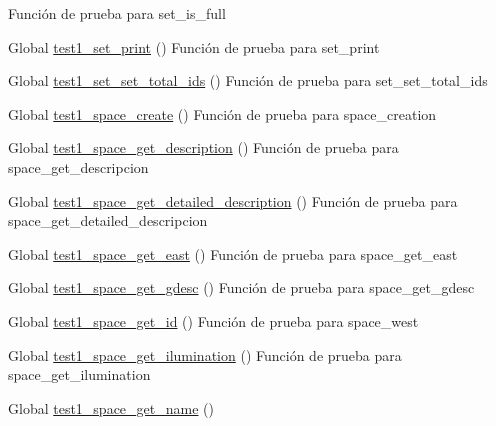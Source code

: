 \begin{DoxyRefList}
Función de prueba para set\+\_\+is\+\_\+full  
\item[Global \mbox{\hyperlink{set__test_8c_a3c854f4944f73793ff85c2490401b6e8}{test1\+\_\+set\+\_\+print}} ()]\label{test__test000239}%
%
Función de prueba para set\+\_\+print  
\item[Global \mbox{\hyperlink{set__test_8c_a4421e7919bd16efc335f14d678fb9560}{test1\+\_\+set\+\_\+set\+\_\+total\+\_\+ids}} ()]\label{test__test000219}%
%
Función de prueba para set\+\_\+set\+\_\+total\+\_\+ids  
\item[Global \mbox{\hyperlink{space__test_8c_a69278cc022dc5688d4725f8d36317b30}{test1\+\_\+space\+\_\+create}} ()]\label{test__test000244}%
%
Función de prueba para space\+\_\+creation  
\item[Global \mbox{\hyperlink{space__test_8c_a9a9da97ed6f49f2ae325177caecfea9c}{test1\+\_\+space\+\_\+get\+\_\+description}} ()]\label{test__test000285}%
%
Función de prueba para space\+\_\+get\+\_\+descripcion  
\item[Global \mbox{\hyperlink{space__test_8c_ab00e408d268230a4ebfa789ce2fba104}{test1\+\_\+space\+\_\+get\+\_\+detailed\+\_\+description}} ()]\label{test__test000295}%
%
Función de prueba para space\+\_\+get\+\_\+detailed\+\_\+descripcion  
\item[Global \mbox{\hyperlink{space__test_8c_a354adb2722b06ec65b7212d2736d6417}{test1\+\_\+space\+\_\+get\+\_\+east}} ()]\label{test__test000267}%
%
Función de prueba para space\+\_\+get\+\_\+east  
\item[Global \mbox{\hyperlink{space__test_8c_a3b6d16613ee2f3940fe7c92f3934508a}{test1\+\_\+space\+\_\+get\+\_\+gdesc}} ()]\label{test__test000280}%
%
Función de prueba para space\+\_\+get\+\_\+gdesc  
\item[Global \mbox{\hyperlink{space__test_8c_a920df9e02482f4f1e6a5ebcaec523860}{test1\+\_\+space\+\_\+get\+\_\+id}} ()]\label{test__test000257}%
%
Función de prueba para space\+\_\+west  
\item[Global \mbox{\hyperlink{space__test_8c_abbf8477d829eeb80c8232719327ea6f0}{test1\+\_\+space\+\_\+get\+\_\+ilumination}} ()]\label{test__test000290}%
%
Función de prueba para space\+\_\+get\+\_\+ilumination  
\item[Global \mbox{\hyperlink{space__test_8c_ad12c42523c517507566c5c68b1527689}{test1\+\_\+space\+\_\+get\+\_\+name}} ()]\label{test__test000261}%

\end{DoxyRefList}
